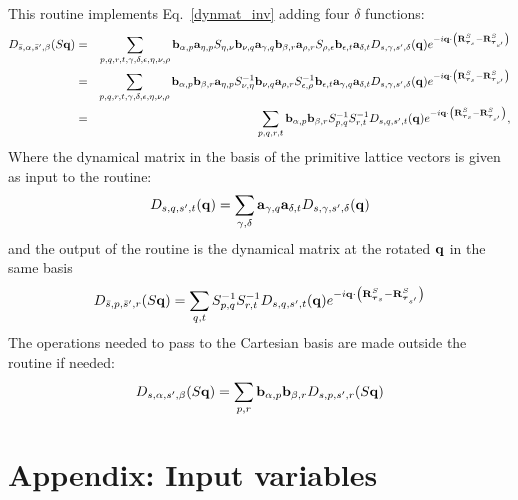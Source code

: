 \documentclass[12pt,a4paper,twoside]{report}
\begin{document}
This routine implements Eq.~\ref{dynmat_inv} adding four
$\delta$ functions:
\begin{eqnarray}
D_{\bar s,\alpha,\bar s',\beta}(S{\bf q}) &=&
\sum_{p,q,r,t,\gamma,\delta,\epsilon,\eta,\nu,\rho}  {\bf b}_{\alpha,p} {\bf a}_{\eta,p}S_{\eta,\nu}{\bf b}_{\nu,q} {\bf a}_{\gamma,q} {\bf b}_{\beta,r} {\bf a}_{\rho,r} S_{ \rho,\epsilon} {\bf b}_{\epsilon,t} {\bf a}_{\delta,t}
D_{s,\gamma,s',\delta}({\bf q})
e^{-i {\bf q} \cdot \left({\bf R}^{S}_{\boldsymbol{\tau}_s} - {\bf R}^{S}_{\boldsymbol{\tau}_{s'}}\right)}
\nonumber \\ &=&
\sum_{p,q,r,t,\gamma,\delta,\epsilon,\eta,\nu,\rho}  {\bf b}_{\alpha,p}{\bf b}_{\beta,r}  {\bf a}_{\eta,p}S^{-1}_{\nu,\eta}{\bf b}_{\nu,q}  {\bf a}_{\rho,r} S^{-1}_{ \epsilon,\rho} {\bf b}_{\epsilon,t} {\bf a}_{\gamma,q} {\bf a}_{\delta,t}
D_{s,\gamma,s',\delta}({\bf q})
e^{-i {\bf q} \cdot \left({\bf R}^{S}_{\boldsymbol{\tau}_s} - {\bf R}^{S}_{\boldsymbol{\tau}_{s'}}\right)}
\nonumber \\
&=&
\sum_{p,q,r,t}  {\bf b}_{\alpha,p}{\bf b}_{\beta,r}  S^{-1}_{p,q} S^{-1}_{r,t} 
D_{s,q,s',t}({\bf q})
e^{-i {\bf q} \cdot \left({\bf R}^{S}_{\boldsymbol{\tau}_s} - {\bf R}^{S}_{\boldsymbol{\tau}_{s'}}\right)}
,
\label{dynmat_inv_cryst}
\end{eqnarray}
Where the dynamical matrix in the basis of the primitive lattice vectors is given as input to the routine:
\begin{equation}
D_{s,q,s',t}({\bf q})= \sum_{\gamma,\delta}
 {\bf a}_{\gamma,q} {\bf a}_{\delta,t}
D_{s,\gamma,s',\delta}({\bf q})
\end{equation}
and the output of the routine is the dynamical matrix
at the rotated ${\bf q}$
in the same basis
\begin{equation}
D_{\bar s,p,\bar s',r}(S{\bf q})=
\sum_{q,t}  S^{-1}_{p,q} S^{-1}_{r,t} 
D_{s,q,s',t}({\bf q})
e^{-i {\bf q} \cdot \left({\bf R}^{S}_{\boldsymbol{\tau}_s} - {\bf R}^{S}_{\boldsymbol{\tau}_{s'}}\right)}
\end{equation}
The operations needed to pass to the Cartesian basis 
are made outside the routine if needed:
\begin{equation}
D_{s,\alpha,s',\beta}(S{\bf q})
=\sum_{p,r}  {\bf b}_{\alpha,p}{\bf b}_{\beta,r}
D_{s,p,s',r}(S{\bf q})
\end{equation}


\section{Appendix: Input variables}
\end{document}
